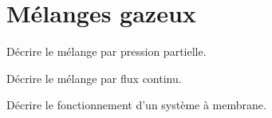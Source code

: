 \documentclass[english,12pt,a4paper]{article}
\begin{document}
	\section{Mélanges gazeux}
	\begin{outline}
		\1 Décrire le mélange par pression partielle.
			\2[] \hspace{-2em}\hrulefill
			\2[] \hspace{-2em}\hrulefill
			\2[] \hspace{-2em}\hrulefill
			\2[] \hspace{-2em}\hrulefill
			\2[] \hspace{-2em}\hrulefill
			\2[] \hspace{-2em}\hrulefill

		\1 Décrire le mélange par flux continu.
			\2[] \hspace{-2em}\hrulefill
			\2[] \hspace{-2em}\hrulefill
			\2[] \hspace{-2em}\hrulefill
			\2[] \hspace{-2em}\hrulefill
			\2[] \hspace{-2em}\hrulefill
			\2[] \hspace{-2em}\hrulefill

		\1 Décrire le fonctionnement d'un système à membrane.
			\2[] \hspace{-2em}\hrulefill
			\2[] \hspace{-2em}\hrulefill
			\2[] \hspace{-2em}\hrulefill
			\2[] \hspace{-2em}\hrulefill
			\2[] \hspace{-2em}\hrulefill
			\2[] \hspace{-2em}\hrulefill

		\1 

	\end{outline}
	\pagebreak
\end{document}
